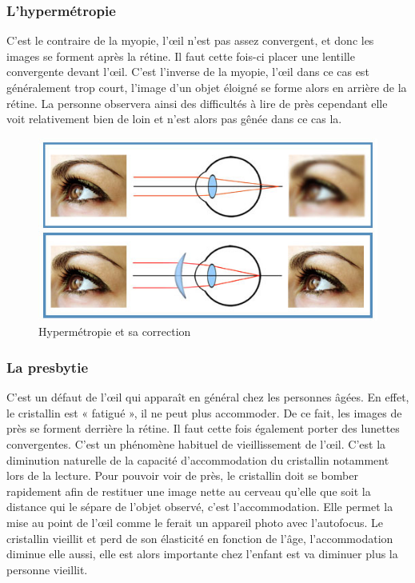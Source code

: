 \documentclass[a4paper, 12pt, onecolumn, openany]{report}
\begin{document}
	\subsubsection{L'hypermétropie}
	C’est le contraire de la myopie, l’œil n’est pas assez convergent, et donc les images se forment après la rétine. Il faut cette fois-ci placer une lentille convergente devant l’œil.	C’est l’inverse de la myopie, l’œil dans ce cas est généralement trop court, l’image d’un objet éloigné se forme alors en arrière de la rétine. La personne observera ainsi des difficultés à lire de près cependant elle voit relativement bien de loin et n’est alors pas gênée dans ce cas la. 
	
	\begin{figure}[h]
	\begin{center}
	\includegraphics[scale=0.5]{hypermetropie.jpg}
	\end{center}
	\caption{Hypermétropie et sa correction}
	\label{Hypermétropie et sa correction}
	\end{figure}
	
	\subsubsection{La presbytie}
	C’est un défaut de l’œil qui apparaît en général chez les personnes âgées. En effet, le cristallin est « fatigué », il ne peut plus accommoder. De ce fait, les images de près se forment derrière la rétine. Il faut cette fois également porter des lunettes convergentes. C’est un phénomène habituel de vieillissement de l’œil. C’est la diminution naturelle de la capacité d’accommodation du cristallin notamment lors de la lecture. Pour pouvoir voir de près, le cristallin doit se bomber rapidement afin de restituer une image nette au cerveau qu’elle que soit la distance qui le sépare de l’objet observé, c’est l’accommodation. Elle permet la mise au point de l’œil comme le ferait un appareil photo avec l’autofocus. Le cristallin vieillit et perd de son élasticité en fonction de l’âge, l’accommodation diminue elle aussi, elle est alors importante chez l’enfant est va diminuer plus la personne vieillit.   
	
\end{document}

